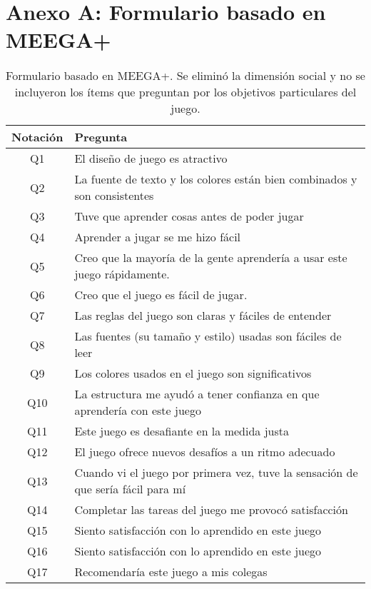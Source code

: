 \chapter*{Anexo A: Formulario basado en MEEGA+} \label{AnexoA}


\begin{table}[h]
\centering
\caption{Formulario basado en MEEGA+. Se eliminó la dimensión social y no se incluyeron los ítems que preguntan por los objetivos particulares del juego.}
\label{TablaFormularioMEEGA}
\begin{tabular}{|c|l|} %
\hline %
\textbf{Notación} & \textbf{Pregunta} \\\hline %
Q1       & El diseño de juego es atractivo \\ 
Q2       & La fuente de texto y los colores están bien combinados y son consistentes \\
Q3       & Tuve que aprender cosas antes de poder jugar \\
Q4       & Aprender a jugar se me hizo fácil \\
Q5       & Creo que la mayoría de la gente aprendería a usar este juego rápidamente. \\
Q6       & Creo que el juego es fácil de jugar. \\
Q7       & Las reglas del juego son claras y fáciles de entender \\
Q8       & Las fuentes (su tamaño y estilo) usadas son fáciles de leer \\
Q9       & Los colores usados en el juego son significativos \\
Q10      & La estructura me ayudó a tener confianza en que aprendería con este juego \\
Q11      & Este juego es desafiante en la medida justa \\
Q12      & El juego ofrece nuevos desafíos a un ritmo adecuado \\
Q13      & Cuando vi el juego por primera vez, tuve la sensación de que sería fácil para mí \\
Q14      & Completar las tareas del juego me provocó satisfacción \\
Q15      & Siento satisfacción con lo aprendido en este juego \\
Q16      & Siento satisfacción con lo aprendido en este juego \\
Q17      & Recomendaría este juego a mis colegas \\

\end{tabular}
\end{table}

